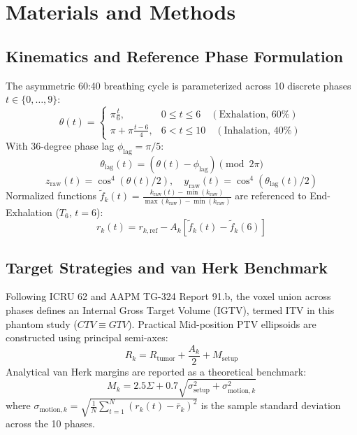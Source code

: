 \documentclass[10pt,twocolumn]{article}
\begin{document}
\section{Materials and Methods}
\subsection{Kinematics and Reference Phase Formulation}
The asymmetric 60:40 breathing cycle is parameterized across 10 discrete phases $t \in \{0, \dots, 9\}$:
\begin{equation}
\theta(t) = \begin{cases}
\pi \frac{t}{6}, & 0 \le t \le 6 \quad (\text{Exhalation, } 60\%) \\
\pi + \pi \frac{t - 6}{4}, & 6 < t \le 10 \quad (\text{Inhalation, } 40\%)
\end{cases}
\end{equation}
With 36-degree phase lag $\phi_{\text{lag}} = \pi / 5$:
\begin{equation}
\theta_{\text{lag}}(t) = (\theta(t) - \phi_{\text{lag}}) \pmod{2\pi}
\end{equation}
\begin{equation}
z_{\text{raw}}(t) = \cos^4(\theta(t)/2), \quad y_{\text{raw}}(t) = \cos^4(\theta_{\text{lag}}(t)/2)
\end{equation}
Normalized functions $\widetilde{f}_k(t) = \frac{k_{\text{raw}}(t) - \min(k_{\text{raw}})}{\max(k_{\text{raw}}) - \min(k_{\text{raw}})}$ are referenced to End-Exhalation ($T_6$, $t=6$):
\begin{equation}
r_k(t) = r_{k,\text{ref}} - A_k \left[\widetilde{f}_k(t) - \widetilde{f}_k(6)\right]
\end{equation}

\subsection{Target Strategies and van Herk Benchmark}
Following ICRU 62 and AAPM TG-324 Report 91.b, the voxel union across phases defines an Internal Gross Target Volume (IGTV), termed ITV in this phantom study ($CTV \equiv GTV$).
Practical Mid-position PTV ellipsoids are constructed using principal semi-axes:
\begin{equation}
R_k = R_{\text{tumor}} + \frac{A_k}{2} + M_{\text{setup}}
\end{equation}
Analytical van Herk margins are reported as a theoretical benchmark:
\begin{equation}
M_k = 2.5 \Sigma + 0.7 \sqrt{\sigma_{\text{setup}}^2 + \sigma_{\text{motion},k}^2}
\end{equation}
where $\sigma_{\text{motion},k} = \sqrt{\frac{1}{N}\sum_{t=1}^N (r_k(t) - \bar{r}_k)^2}$ is the sample standard deviation across the 10 phases.
\end{document}
